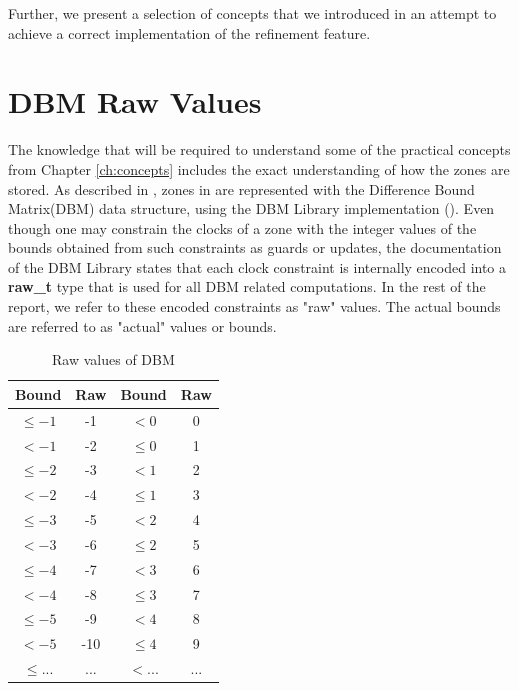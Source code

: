 Further, we present a selection of concepts that we introduced in an attempt to achieve a correct implementation of the refinement feature.

\section{DBM Raw Values} \label{sec:raw-values}
The knowledge that will be required to understand some of the practical concepts from Chapter \ref{ch:concepts} includes the exact understanding of how the zones are stored. As described in \textcite{Jecdar:2019}, zones in \jecdar are represented with the Difference Bound Matrix(DBM) data structure, using the DBM Library implementation (\textcite{dbm-library-web}). Even though one may constrain the clocks of a zone with the integer values of the bounds obtained from such constraints as guards or updates, the \textcite{dbm-manual} documentation of the DBM Library states that each clock constraint is internally encoded into a \textbf{raw\_t} type that is used for all DBM related computations. In the rest of the report, we refer to these encoded constraints as "raw" values. The actual bounds are referred to as "actual" values or bounds. 

\begin{table}
\centering
\begin{tabular}{| c | c || c | c |}
\hline
Bound & Raw & Bound & Raw \\
\hline
$\leq -1$ & -1 &$< 0$     & 0  \\
$< -1   $ & -2 & $\leq 0$ & 1  \\
$\leq -2$ & -3 &$< 1$     & 2  \\
$< -2   $ & -4 & $\leq 1$ & 3  \\
$\leq -3$ & -5 &$< 2$     & 4  \\
$< -3   $ & -6 & $\leq 2$ & 5  \\
$\leq -4$ & -7 &$< 3$     & 6  \\
$< -4   $ & -8 & $\leq 3$ & 7  \\
$\leq -5$ & -9 &$< 4$     & 8  \\
$< -5   $ & -10 & $\leq 4$ & 9  \\
$\leq ...$ & ... & $< ...$ & ...  \\
\hline
\end{tabular}
\caption{Raw values of DBM}
    \label{tbl:raw-values}
\end{table}

